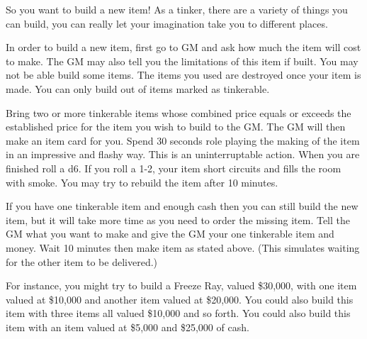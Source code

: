 \documentclass[green]{LRSguildcamp1}
\begin{document}
\name{\gTinkering{}}

So you want to build a new item! As a tinker, there are a variety of things you can build, you can really let your imagination take you to different places. 

In order to build a new item, first go to GM and ask how much the item will cost to make. The GM may also tell you the limitations of this item if built. You may not be able build some items. The items you used are destroyed once your item is made. You can only build out of items marked as tinkerable.

Bring two or more tinkerable items whose combined price equals or exceeds the established price for the item you wish to build to the GM. 
The GM will then make an item card for you. Spend 30 seconds role playing the making of the item in an impressive and flashy way. This is an uninterruptable action. When you are finished roll a d6.  If you roll a 1-2, your item short circuits and fills the room with smoke. You may try to rebuild the item after 10 minutes. 

If you have one tinkerable item and enough cash then you can still build the new item, but it will take more time as you need to order the missing item. Tell the GM what you want to make and give the GM your one tinkerable item and money. Wait 10 minutes then make item as stated above. (This simulates waiting for the other item to be delivered.) 

For instance, you might try to build a Freeze Ray, valued \$30,000, with one item valued at \$10,000 and another item valued at \$20,000. You could also build this item with three items all valued \$10,000 and so forth. You could also build this item with an item valued at \$5,000 and \$25,000 of cash. 

\end{document}
